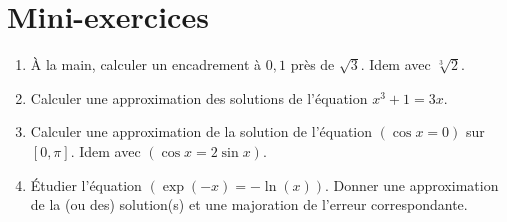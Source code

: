 \section{Mini-exercices}

\begin{frame}

\begin{miniexercice}
\begin{enumerate}
  \item \`A la main, calculer un encadrement à $0,1$ près de $\sqrt{3}$.
  Idem avec $\sqrt[3]{2}$. 
  
  \item Calculer une approximation des solutions de l'équation $x^3+1=3x$.
  
  \item Calculer une approximation de la solution de l'équation $(\cos x = 0)$ sur $[0,\pi]$.   
  Idem avec $(\cos x = 2\sin x)$.
  
  \item \'Etudier l'équation $(\exp(-x) = - \ln(x))$. Donner une approximation de la (ou des) 
  solution(s) et une majoration de l'erreur correspondante.
\end{enumerate}
\end{miniexercice}

\end{frame}

